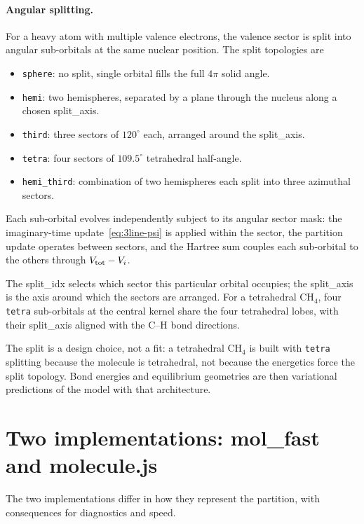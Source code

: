 \paragraph{Angular splitting.} For a heavy atom with multiple valence electrons, the valence sector is split into angular sub-orbitals at the same nuclear position. The split topologies are
\begin{itemize}
\item \texttt{sphere}: no split, single orbital fills the full $4\pi$ solid angle.
\item \texttt{hemi}: two hemispheres, separated by a plane through the nucleus along a chosen split\_axis.
\item \texttt{third}: three sectors of $120^\circ$ each, arranged around the split\_axis.
\item \texttt{tetra}: four sectors of $109.5^\circ$ tetrahedral half-angle.
\item \texttt{hemi\_third}: combination of two hemispheres each split into three azimuthal sectors.
\end{itemize}
Each sub-orbital evolves independently subject to its angular sector mask: the imaginary-time update~\eqref{eq:3line-psi} is applied within the sector, the partition update operates between sectors, and the Hartree sum couples each sub-orbital to the others through $V_{\rm tot} - V_i$.

The split\_idx selects which sector this particular orbital occupies; the split\_axis is the axis around which the sectors are arranged. For a tetrahedral CH$_4$, four \texttt{tetra} sub-orbitals at the central kernel share the four tetrahedral lobes, with their split\_axis aligned with the C--H bond directions.

The split is a design choice, not a fit: a tetrahedral CH$_4$ is built with \texttt{tetra} splitting because the molecule is tetrahedral, not because the energetics force the split topology. Bond energies and equilibrium geometries are then variational predictions of the model with that architecture.

\section{Two implementations: mol\_fast and molecule.js}\label{sec:two-implementations}

The two implementations differ in how they represent the partition, with consequences for diagnostics and speed.

